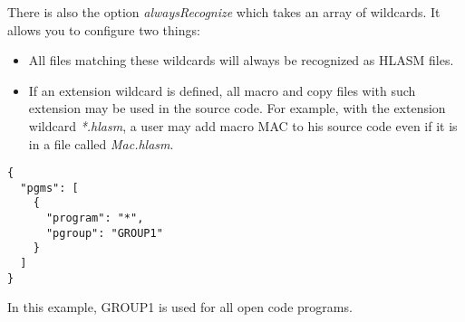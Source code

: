 There is also the option \emph{alwaysRecognize} which takes an array of wildcards. It allows you to configure two things:
\begin{itemize}
	\item All files matching these wildcards will always be recognized as HLASM files. 
	\item If an extension wildcard is defined, all macro and copy files with such extension may be used in the source code. For example, with the extension wildcard \emph{*.hlasm}, a user may add macro MAC to his source code even if it is in a file called \emph{Mac.hlasm}.
\end{itemize}

\begin{listing}[H]
	\begin{verbatim}
{
  "pgms": [
    {
      "program": "*",
      "pgroup": "GROUP1"  
    }
  ]
}
	\end{verbatim}
	\caption{In this example, GROUP1 is used for all open code programs.}
\end{listing}